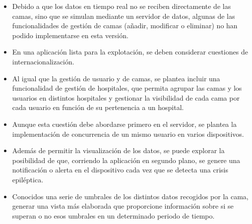 \begin{itemize}
	\item Debido a que los datos en tiempo real no se reciben directamente de las camas, sino que se simulan mediante un servidor de datos, algunas de las funcionalidades de gestión de camas (añadir, modificar o eliminar) no han podido implementarse en esta versión. 
	\item En una aplicación lista para la explotación, se deben considerar cuestiones de internacionalización. 
	\item Al igual que la gestión de usuario y de camas, se plantea incluir una funcionalidad de gestión de hospitales, que permita agrupar las camas y los usuarios en distintos hospitales y gestionar la visibilidad de cada cama por cada usuario en función de su pertenencia a un hospital. 
	\item Aunque esta cuestión debe abordarse primero en el servidor, se plantea la implementación de concurrencia de un mismo usuario en varios dispositivos. 
	\item Además de permitir la visualización de los datos, se puede explorar la posibilidad de que, corriendo la aplicación en segundo plano, se genere una notificación o alerta en el dispositivo cada vez que se detecta una crisis epiléptica. 
	\item Conocidos una serie de umbrales de los distintos datos recogidos por la cama, generar una vista más elaborada que proporcione información sobre si se superan o no esos umbrales en un determinado periodo de tiempo. 
\end{itemize}


